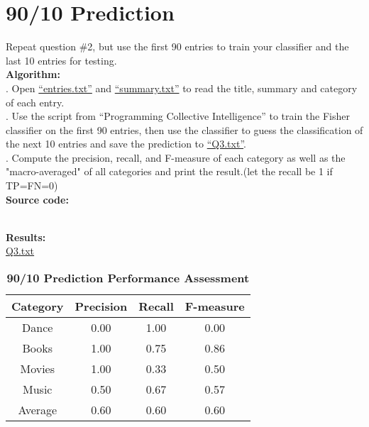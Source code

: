 \documentclass{article}
\begin{document}
		\section{90/10 Prediction}
		Repeat question \#2, but use the first 90 entries to train your classifier and the last 10 entries for testing.\\

		\noindent\textbf{Algorithm:}\\
		. Open \href{https://github.com/zhangboroy/cs532-s17/blob/master/assg09_submission/entries.txt}{``entries.txt''} and \href{https://github.com/zhangboroy/cs532-s17/blob/master/assg09_submission/summary.txt}{``summary.txt''} to read the title, summary and category of each entry.\\
		. Use the script from ``Programming Collective Intelligence'' to train the Fisher classifier on the first 90 entries, then use the classifier to guess the classification of the next 10 entries and save the prediction to \href{https://github.com/zhangboroy/cs532-s17/blob/master/assg09_submission/Q3.txt}{``Q3.txt''}.\\
		. Compute the precision, recall, and F-measure of each category as well as the "macro-averaged"
of all categories and print the result.(let the recall be 1 if TP=FN=0)\\

		\noindent\textbf{Source code:}
		

		\noindent\\\textbf{Results:}\\
		\indent\href{https://github.com/zhangboroy/cs532-s17/blob/master/assg09_submission/Q3.txt}{Q3.txt}\\
		\begin{table}[!htb]
			\centering
			\caption{\textbf{90/10 Prediction Performance Assessment}}
			\begin{tabular}{cccc}
				\toprule
				\textbf{Category} & \textbf{Precision} & \textbf{Recall} & \textbf{F-measure}\\
				\midrule
				Dance & 0.00 & 1.00 & 0.00\\
				Books & 1.00 & 0.75 & 0.86\\
				Movies & 1.00 & 0.33 & 0.50\\
				Music & 0.50 & 0.67 & 0.57\\
				Average & 0.60 & 0.60 & 0.60\\			
				\bottomrule
			\end{tabular}
		\end{table}
	
\end{document}
